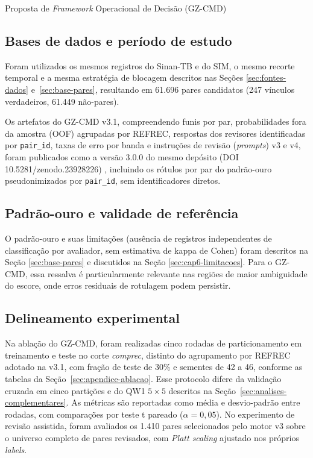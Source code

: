 \begin{chapter}{Proposta de \textit{Framework} Operacional de Decisão (GZ-CMD)}
\subsection{Bases de dados e período de estudo}
\label{sec:cap8-bases}

Foram utilizados os mesmos registros do Sinan-TB e do SIM, o mesmo recorte temporal e a mesma estratégia de blocagem descritos nas Seções \ref{sec:fontes-dados} e~\ref{sec:base-pares}, resultando em 61.696 pares candidatos (247 vínculos verdadeiros, 61.449 não-pares).

Os artefatos do GZ-CMD v3.1, compreendendo funis por par, probabilidades fora da amostra (OOF) agrupadas por REFREC, respostas dos revisores identificadas por \texttt{pair\_id}, taxas de erro por banda e instruções de revisão (\textit{prompts}) v3 e v4, foram publicados como a versão 3.0.0 do mesmo depósito (DOI 10.5281/zenodo.23928226) \cite{Jardim2026zenodoGzcmd}, incluindo os rótulos por par do padrão-ouro pseudonimizados por \texttt{pair\_id}, sem identificadores diretos.

\subsection{Padrão-ouro e validade de referência}
\label{sec:cap8-padrao-ouro}

O padrão-ouro e suas limitações (ausência de registros independentes de classificação por avaliador, sem estimativa de kappa de Cohen) foram descritos na Seção \ref{sec:base-pares} e discutidos na Seção \ref{sec:cap6-limitacoes}. Para o GZ-CMD, essa ressalva é particularmente relevante nas regiões de maior ambiguidade do escore, onde erros residuais de rotulagem podem persistir.

\subsection{Delineamento experimental}
\label{sec:cap8-delineamento}

Na ablação do GZ-CMD, foram realizadas cinco rodadas de particionamento em treinamento e teste no corte \textit{comprec}, distinto do agrupamento por REFREC adotado na v3.1, com fração de teste de 30\% e sementes de 42 a 46, conforme as tabelas da Seção~\ref{sec:apendice-ablacao}. Esse protocolo difere da validação cruzada em cinco partições e do QW1 $5 \times 5$ descritos na Seção~\ref{sec:analises-complementares}. As métricas são reportadas como média e desvio-padrão entre rodadas, com comparações por teste t pareado ($\alpha=0{,}05$). No experimento de revisão assistida, foram avaliados os 1.410 pares selecionados pelo motor v3 sobre o universo completo de pares revisados, com \textit{Platt scaling} ajustado nos próprios \textit{labels}.


\end{chapter}
